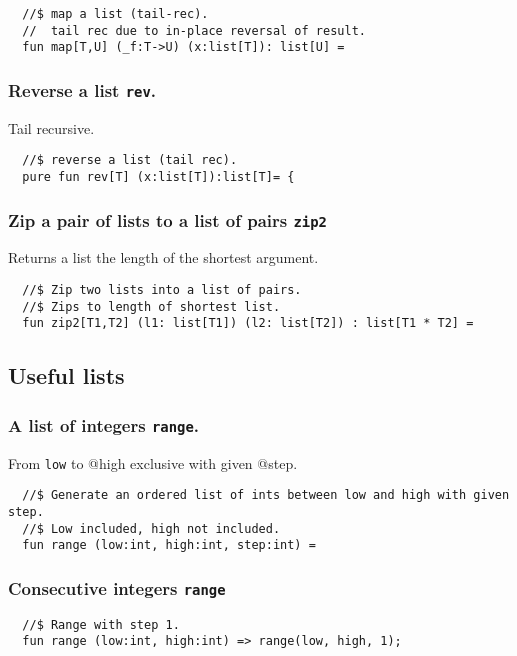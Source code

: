 \documentclass[oneside]{book}
\begin{document}
\begin{verbatim}
  //$ map a list (tail-rec).
  //  tail rec due to in-place reversal of result.
  fun map[T,U] (_f:T->U) (x:list[T]): list[U] =
\end{verbatim}

\subsubsection{Reverse a list {\tt rev}.}
Tail recursive.

\begin{verbatim}
  //$ reverse a list (tail rec).
  pure fun rev[T] (x:list[T]):list[T]= {
\end{verbatim}

\subsubsection{Zip a pair of lists to a list of pairs {\tt zip2}}
Returns a list the length of the shortest argument.

\begin{verbatim}
  //$ Zip two lists into a list of pairs.
  //$ Zips to length of shortest list.
  fun zip2[T1,T2] (l1: list[T1]) (l2: list[T2]) : list[T1 * T2] = 
\end{verbatim}

\subsection{Useful lists}
\subsubsection{A list of integers {\tt range}.}
From {\tt low} to @{high} exclusive with given @{step}.

\begin{verbatim}
  //$ Generate an ordered list of ints between low and high with given step.
  //$ Low included, high not included.
  fun range (low:int, high:int, step:int) =
\end{verbatim}

\subsubsection{Consecutive integers {\tt range}}
\begin{verbatim}
  //$ Range with step 1.
  fun range (low:int, high:int) => range(low, high, 1);
\end{verbatim}
\end{document}
